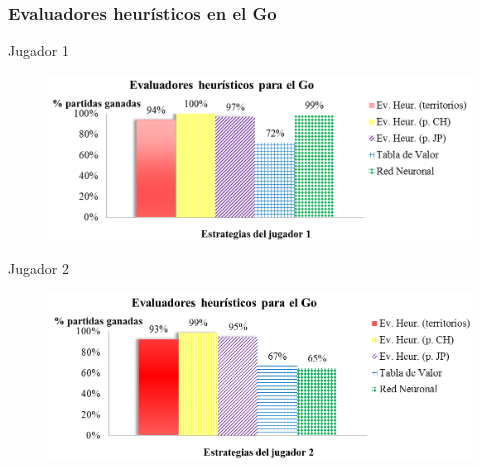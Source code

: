 \documentclass[10pt]{beamer}
\begin{document}
\begin{frame}[t]
\frametitle{Evaluadores heurísticos en el Go}
{\large Jugador 1}
\begin{figure}[t]
\centering
\includegraphics[scale=0.2]{imagenes/heuristicosGojug1.png}
\label{fig:heuristicosGojug1}
\end{figure}

{\large Jugador 2}
\begin{figure}[t]
\centering
\includegraphics[scale=0.2]{imagenes/heuristicosGojug2.png}
\label{fig:heuristicosGojug2}
\end{figure}
\end{frame}
\end{document}
